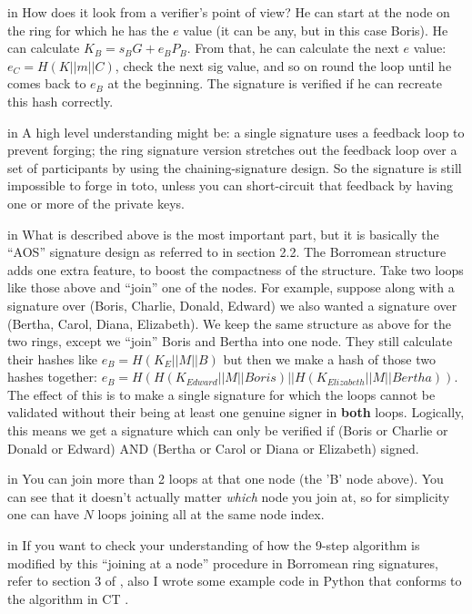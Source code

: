 \documentclass[10pt,a4paper]{article}
\begin{document}
 in \noindent How does it look from a verifier's point of view? He can start at the node on the ring for which he has the $e$ value (it can be any, but in this case Boris). He can calculate $K_B = s_{B}G + e_{B}P_B$. From that, he can calculate the next $e$ value: $e_C = H(K || m || C)$, check the next sig value, and so on round the loop until he comes back to $e_B$ at the beginning. The signature is verified if he can recreate this hash correctly.

 in \noindent A high level understanding might be: a single signature uses a feedback loop to prevent forging; the ring signature version stretches out the feedback loop over a set of participants by using the chaining-signature design. So the signature is still impossible to forge in toto, unless you can short-circuit that feedback by having one or more of the private keys.

 in \noindent What is described above is the most important part, but it is basically the ``AOS'' signature design as referred to in \cite{borromean} section 2.2. The Borromean structure adds one extra feature, to boost the compactness of the structure. Take two loops like those above and ``join'' one of the nodes. For example, suppose along with a signature over (Boris, Charlie, Donald, Edward) we also wanted a signature over (Bertha, Carol, Diana, Elizabeth). We keep the same structure as above for the two rings, except we ``join'' Boris and Bertha into one node. They still calculate their hashes like $e_B = H(K_E || M || B)$ but then we make a hash of those two hashes together: $e_B = H(H(K_{Edward} || M || Boris) || H(K_{Elizabeth} || M || Bertha))$. The effect of this is to make a single signature for which the loops cannot be validated without their being at least one genuine signer in \textbf{both} loops. Logically, this means we get a signature which can only be verified if (Boris or Charlie or Donald or Edward) AND (Bertha or Carol or Diana or Elizabeth) signed.

 in \noindent You can join more than 2 loops at that one node (the 'B' node above). You can see that it doesn't actually matter \textit{which} node you join at, so for simplicity one can have $N$ loops joining all at the same node index.

 in \noindent If you want to check your understanding of how the 9-step algorithm is modified by this ``joining at a node'' procedure in Borromean ring signatures, refer to section 3 of \cite{borromean} , also I wrote some example code in Python that conforms to the algorithm in CT \cite{borring}.
\end{document}
